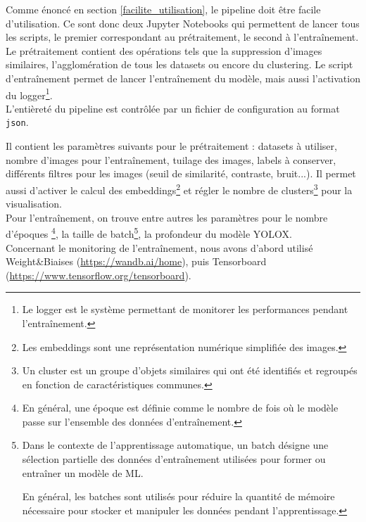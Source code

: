 Comme énoncé en section \ref{facilite_utilisation}, le pipeline doit être facile d'utilisation.
Ce sont donc deux Jupyter Notebooks qui permettent de lancer tous les scripts, le premier correspondant
au prétraitement, le second à l'entraînement. Le prétraitement contient des opérations tels que
la suppression d'images similaires, l'agglomération de tous les datasets ou encore du clustering.
Le script d'entraînement permet de lancer l'entraînement du modèle, mais aussi l'activation du
logger\footnote{Le logger est le système permettant de monitorer les performances pendant l'entraînement.}.\\


L'entièreté du pipeline est contrôlée par un fichier de configuration au format \texttt{json}.

Il contient les paramètres suivants pour le prétraitement : datasets à utiliser, nombre d'images pour
l'entraînement, tuilage des images, labels à conserver, différents filtres pour les images (seuil de
similarité, contraste, bruit...). Il permet aussi d'activer le calcul des embeddings\footnote{
Les embeddings sont une représentation numérique simplifiée des images.}
et régler le nombre de clusters\footnote{Un cluster est un groupe d'objets similaires 
qui ont été identifiés et regroupés en fonction de caractéristiques communes.} pour la visualisation.\\

Pour l'entraînement, on trouve entre autres les paramètres pour le nombre d'époques
\footnote{En général, une époque est définie comme le nombre de fois où le modèle passe sur l'ensemble des données d'entraînement.}, la taille de batch\footnote{Dans le contexte de l'apprentissage automatique, un batch désigne une sélection partielle des données d'entraînement utilisées pour former ou entraîner un modèle de ML.

En général, les batches sont utilisés pour réduire la quantité de mémoire nécessaire pour stocker et manipuler les données pendant l'apprentissage.},
la profondeur du modèle YOLOX.\\

Concernant le monitoring de l'entraînement, nous avons d'abord utilisé Weight\&Biaises
(\url{https://wandb.ai/home}), puis Tensorboard (\url{https://www.tensorflow.org/tensorboard}). \\

